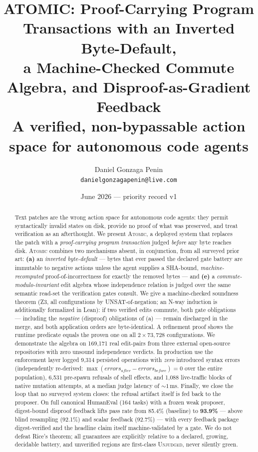 \documentclass[11pt]{article}
\title{ATOMIC: Proof-Carrying Program Transactions with an Inverted Byte-Default,\\
a Machine-Checked Commute Algebra, and Disproof-as-Gradient Feedback\\
\large A verified, non-bypassable action space for autonomous code agents}
\author{Daniel Gonzaga Penin\\
\small \texttt{danielgonzagapenin@live.com}}
\date{June 2026 --- priority record v1}
\begin{document}
\maketitle

\begin{abstract}
Text patches are the wrong action space for autonomous code agents: they permit
syntactically invalid states on disk, provide no proof of what was preserved, and
treat verification as an afterthought. We present \textsc{Atomic}, a deployed
system that replaces the patch with a \emph{proof-carrying program transaction}
judged \emph{before} any byte reaches disk. \textsc{Atomic} combines two mechanisms
absent, in conjunction, from all surveyed prior art: \textbf{(a)} an
\emph{inverted byte-default} --- bytes that ever passed the declared gate battery
are immutable to negative actions unless the agent supplies a SHA-bound,
\emph{machine-recomputed} proof-of-incorrectness for exactly the removed bytes ---
and \textbf{(e)} a \emph{commute-modulo-invariant} edit algebra whose independence
relation is judged over the same semantic read-set the verification gates consult.
We give a machine-checked soundness theorem (Z3, all configurations by
UNSAT-of-negation; an N-way induction is additionally formalized in Lean): if two
verified edits commute, both gate obligations --- including the \emph{negative}
(disproof) obligations of (a) --- remain discharged in the merge, and both
application orders are byte-identical. A refinement proof shows the runtime
predicate equals the proven one on all $2{\times}73{,}728$ configurations. We
demonstrate the algebra on 169{,}171 real edit-pairs from three external
open-source repositories with zero unsound independence verdicts. In production
use the enforcement layer logged 9{,}314 persisted operations with \emph{zero}
introduced syntax errors (independently re-derived: $\max(\mathit{errors}_{\mathit{after}}
- \mathit{errors}_{\mathit{before}}) = 0$ over the entire population), 6{,}531
pre-spawn refusals of shell effects, and 1{,}088 live-traffic blocks of native
mutation attempts, at a median judge latency of ${\sim}1$\,ms. Finally, we close
the loop that no surveyed system closes: the refusal artifact itself is fed back
to the proposer. On full canonical HumanEval (164 tasks) with a frozen weak
proposer, digest-bound disproof feedback lifts pass rate from 85.4\% (baseline)
to \textbf{93.9\%} --- above blind resampling (92.1\%) and scalar feedback
(92.7\%) --- with every feedback package digest-verified and the headline claim
itself machine-validated by a gate. We do not defeat Rice's theorem; all
guarantees are explicitly relative to a declared, growing, decidable battery, and
unverified regions are first-class \textsc{Unjudged}, never silently green.
\end{abstract}
\end{document}
